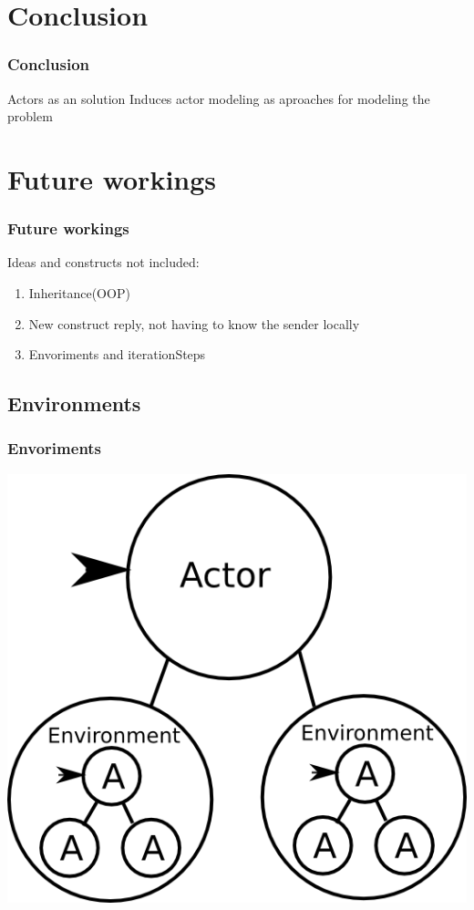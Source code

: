 \section{Conclusion}
\begin{frame}
	\frametitle{Conclusion}
	Actors as an solution
	Induces actor modeling as aproaches for modeling the problem
\end{frame}

\section{Future workings}
\begin{frame}
	\frametitle{Future workings}
	Ideas and constructs not included: 
  \begin{enumerate}
    \item Inheritance(OOP)
    \item New construct reply, not having to know the sender locally
    \item Envoriments and iterationSteps
  \end{enumerate}
\end{frame}

\subsection{Environments}
\begin{frame}
	\frametitle{Envoriments}
	\includegraphics[width=\textwidth/2]{Images/environment.png}
\end{frame}
